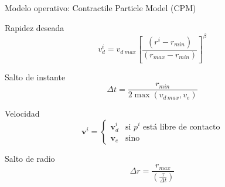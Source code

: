 \begin{frame}{Modelo operativo: Contractile Particle Model (CPM)}
    \begin{center}
        \begin{minipage}[t]{0.45\textwidth}
            \begin{block}{Rapidez deseada}
                \begin{equation*}
                    v_d^i = v_{d\ max} \left[ \frac{(r^i - r_{min})}{(r_{max} - r_{min})} \right]^{\beta}
                \end{equation*}
            \end{block}
        \end{minipage}
        \hfill
        \begin{minipage}[t]{0.45\textwidth}
            \begin{block}{Salto de instante}
                \begin{equation*}
                    \Delta t = \frac{r_{min}}{2 \max (v_{d\ max}, v_e)}
                \end{equation*}
            \end{block}
        \end{minipage}
    \end{center}
    \begin{center}
        \begin{minipage}[t]{0.45\textwidth}
            \begin{block}{Velocidad}
                \begin{equation*}
                    \mathbf{v}^i = \begin{cases}
                                       \mathbf{v}_d^i & \text{si $p^i$ está libre de contacto} \\
                                       \mathbf{v}_e & \text{sino}
                    \end{cases}
                \end{equation*}
            \end{block}
        \end{minipage}
        \hfill
        \begin{minipage}[t]{0.45\textwidth}
            \begin{block}{Salto de radio}
                \begin{equation*}
                    \Delta r = \frac{r_{max}}{\left( \frac{\tau}{\Delta t} \right)}
                \end{equation*}
            \end{block}
        \end{minipage}
    \end{center}
\end{frame}

